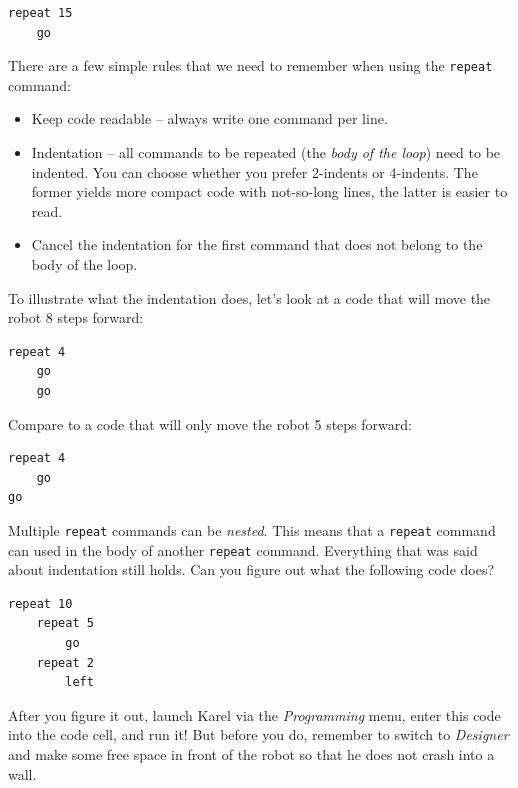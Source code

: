 \begin{verbatim}
repeat 15
    go
\end{verbatim}
There are a few simple rules that we need to remember when using the {\tt repeat} command:

\begin{itemize}
\item Keep code readable -- always write one command per line.
\item Indentation -- all commands to be repeated (the {\em body of the loop}) need to be indented. You can
      choose whether you prefer 2-indents or 4-indents. The former yields more compact 
      code with not-so-long lines, the latter is easier to read. 
\item Cancel the indentation for the first command that does not belong to the body of the loop.
\end{itemize}
To illustrate what the indentation does, let's look at a code that will move the robot 8 steps forward:

\begin{verbatim}
repeat 4
    go
    go
\end{verbatim}
Compare to a code that will only move the robot 5 steps forward:

\begin{verbatim}
repeat 4
    go
go
\end{verbatim}
Multiple {\tt repeat} commands can be {\em nested}. This means that a {\tt repeat} command 
can used in the body of another {\tt repeat} command. Everything that was said about indentation 
still holds. Can you figure out what the following code does?

\begin{verbatim}
repeat 10
    repeat 5
        go
    repeat 2
        left
\end{verbatim}
After you figure it out, launch Karel via the {\em Programming} menu, enter this code into
the code cell, and run it! But before you do, remember to switch to {\em Designer} and make 
some free space in front of the robot 
so that he does not crash into a wall.



